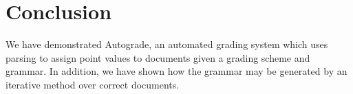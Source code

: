 \section{Conclusion}

We have demonstrated Autograde, an automated grading system which uses parsing
to assign point values to documents given a grading scheme and grammar.  In
addition, we have shown how the grammar may be generated by an iterative method
over correct documents.
